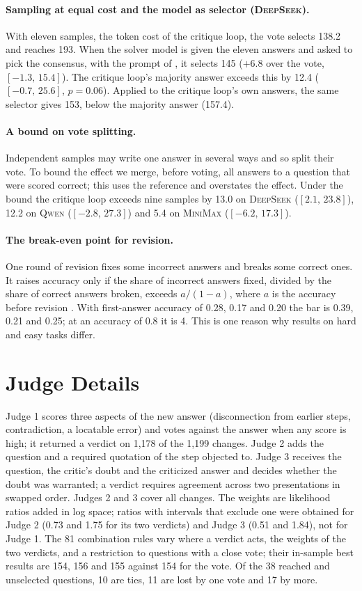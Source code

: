 \documentclass[11pt]{article}
\newcommand{\ds}{\textsc{DeepSeek}}
\newcommand{\qw}{\textsc{Qwen}}
\newcommand{\mm}{\textsc{MiniMax}}
\newcommand{\ci}[2]{$[#1,\,#2]$}
\begin{document}
\paragraph{Sampling at equal cost and the model as selector (\ds).}
With eleven samples, the token cost of the critique loop, the vote selects 138.2 and reaches 193.
When the solver model is given the eleven answers and asked to pick the consensus, with the prompt of \citet{chen2023usc}, it selects 145 ($+6.8$ over the vote, \ci{-1.3}{15.4}).
The critique loop's majority answer exceeds this by 12.4 (\ci{-0.7}{25.6}, $p=0.06$).
Applied to the critique loop's own answers, the same selector gives 153, below the majority answer (157.4).

\paragraph{A bound on vote splitting.}
Independent samples may write one answer in several ways and so split their vote.
To bound the effect we merge, before voting, all answers to a question that were scored correct; this uses the reference and overstates the effect.
Under the bound the critique loop exceeds nine samples by 13.0 on \ds{} (\ci{2.1}{23.8}), 12.2 on \qw{} (\ci{-2.8}{27.3}) and 5.4 on \mm{} (\ci{-6.2}{17.3}).

\paragraph{The break-even point for revision.}
One round of revision fixes some incorrect answers and breaks some correct ones.
It raises accuracy only if the share of incorrect answers fixed, divided by the share of correct answers broken, exceeds $a/(1-a)$, where $a$ is the accuracy before revision \citep{yang2024confidence}.
With first-answer accuracy of 0.28, 0.17 and 0.20 the bar is 0.39, 0.21 and 0.25; at an accuracy of 0.8 it is 4.
This is one reason why results on hard and easy tasks differ.

\section{Judge Details}
\label{app:judges}

Judge 1 scores three aspects of the new answer (disconnection from earlier steps, contradiction, a locatable error) and votes against the answer when any score is high; it returned a verdict on 1{,}178 of the 1{,}199 changes.
Judge 2 adds the question and a required quotation of the step objected to.
Judge 3 receives the question, the critic's doubt and the criticized answer and decides whether the doubt was warranted; a verdict requires agreement across two presentations in swapped order.
Judges 2 and 3 cover all changes.
The weights are likelihood ratios added in log space; ratios with intervals that exclude one were obtained for Judge 2 (0.73 and 1.75 for its two verdicts) and Judge 3 (0.51 and 1.84), not for Judge 1.
The 81 combination rules vary where a verdict acts, the weights of the two verdicts, and a restriction to questions with a close vote; their in-sample best results are 154, 156 and 155 against 154 for the vote.
Of the 38 reached and unselected questions, 10 are ties, 11 are lost by one vote and 17 by more.
\end{document}
